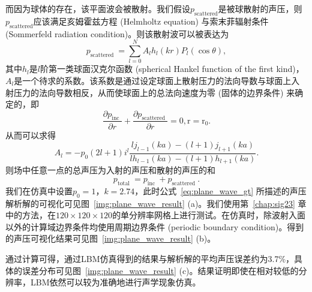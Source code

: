 而因为球体的存在，该平面波会被散射。我们假设$p_{\text {scattered}}$是被球散射的声压，则$p_{\text {scattered}}$应该满足亥姆霍兹方程 (Helmholtz equation) 与索末菲辐射条件 (Sommerfeld radiation condition)。则该散射波可以被表达为
\begin{equation}
  p_{\text {scattered }}=\sum_{l=0}^{N} A_{l} h_{l}(k r) P_{l}(\cos \theta),
\end{equation}
其中$h_{l}$是$l$阶第一类球面汉克尔函数 (spherical Hankel function of the first kind)，$A_{l}$是一个待求的系数。该系数是通过设定球面上散射压力的法向导数与球面上入射压力的法向导数相反，从而使球面上的总法向速度为零 (固体的边界条件) 来确定的，即
\begin{equation}
  \frac{\partial p_{\text {inc }}}{\partial r}+\frac{\partial p_{\text {scattered }}}{\partial r}=0, \mathrm{r}=\mathrm{r_0}.
\end{equation}
从而可以求得
\begin{equation}
  A_{l}=-p_{0}(2 l+1) i^{l} \frac{l j_{l-1}(k a)-(l+1) j_{l+1}(k a)}{l h_{l-1}(k a)-(l+1) h_{l+1}(k a)}.
\end{equation}
则场中任意一点的总声压为入射的声压和散射的声压的和
\begin{equation}
  p_{\text {total }}=p_{\text {inc }}+p_{\text {scattered }}.
  \label{eq:plane_wave_gt}
\end{equation}
我们在仿真中设置$p_0=1$，$k=2.74$，此时公式~\ref{eq:plane_wave_gt} 所描述的声压解析解的可视化可见图~\ref{img:plane_wave_result} (a)。我们使用第~\ref{chap:sig23} 章中的方法，在$120\times120\times120$的单分辨率网格上进行测试。在仿真时，除波射入面以外的计算域边界条件均使用周期边界条件 (periodic boundary condition)。得到的声压可视化结果可见图~\ref{img:plane_wave_result} (b)。

通过计算可得，通过LBM仿真得到的结果与解析解的平均声压误差约为3.7\%，具体的误差分布可见图~\ref{img:plane_wave_result} (c)。结果证明即使在相对较低的分辨率，LBM依然可以较为准确地进行声学现象仿真。

